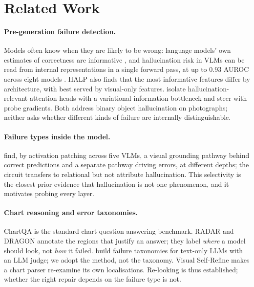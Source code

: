 \section{Related Work}
\label{sec:related}

\paragraph{Pre-generation failure detection.} Models often know when they are
likely to be wrong: language models' own estimates of correctness are informative
\citep{kadavath2022know}, and hallucination risk in VLMs can be read from internal
representations in a single forward pass, at up to 0.93 AUROC across eight
models \citep{kogilathota2026halp}. HALP also finds that the most informative
features differ by architecture, with \qwen best served by visual-only features.
\citet{zhang2026vibprobe} isolate hallucination-relevant attention heads with a
variational information bottleneck and steer with probe gradients. Both address
binary object hallucination on photographs; neither asks whether different kinds
of failure are internally distinguishable.

\paragraph{Failure types inside the model.} \citet{liu2026dualpathway} find, by
activation patching across five VLMs, a visual grounding pathway behind correct
predictions and a separate pathway driving errors, at different depths; the
circuit transfers to relational but not attribute hallucination. This
selectivity is the closest prior evidence that hallucination is not one
phenomenon, and it motivates probing every layer.

\paragraph{Chart reasoning and error taxonomies.} ChartQA
\citep{masry2022chartqa} is the standard chart question answering benchmark.
RADAR \citep{rani2025radar} and DRAGON \citep{iyengar2026dragon} annotate the
regions that justify an answer; they label \emph{where} a model should look, not
\emph{how} it failed. \citet{ashurytahan2026errormap} build failure taxonomies
for text-only LLMs with an LLM judge; we adopt the method, not the taxonomy.
Visual Self-Refine \citep{li2026visualselfrefine} makes a chart parser
re-examine its own localisations. Re-looking is thus established; whether the
right repair depends on the failure type is not.


